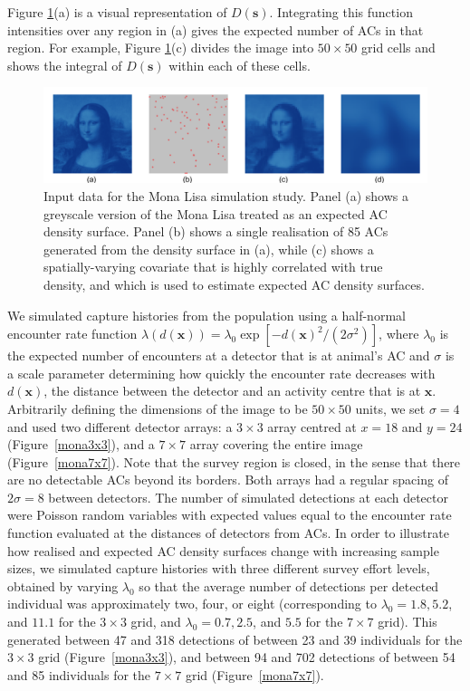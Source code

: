 \documentclass[useAMS,usenatbib,referee]{biom}
\begin{document}
Figure \ref{mlinputs}(a) is a visual representation of $D(\bm{s})$. Integrating this function intensities over any region in (a) gives the expected number of ACs in that region. For example, Figure \ref{mlinputs}(c) divides the image into 
$50 \times 50$ grid cells and shows the integral of $D(\bm{s})$ within each of these cells. 

\begin{figure}[htbp]
\centering
\includegraphics[width=1\textwidth]{mona_inputdata.png}
\caption{Input data for the Mona Lisa simulation study. Panel (a) shows a greyscale version of the Mona Lisa treated as an expected AC density surface. Panel (b) shows a single realisation of 85 ACs generated from the density surface in (a), while (c) shows a spatially-varying covariate that is highly correlated with true density, and which is used to estimate expected AC density surfaces.}
\label{mlinputs}
\end{figure}

We simulated capture histories from the population using a half-normal encounter rate function $\lambda(d(\textbf{x})) = \lambda_0\exp[-d(\textbf{x})^2/(2\sigma^2)]$, where $\lambda_0$ is the expected number of encounters at a detector that is at animal's AC and $\sigma$ is a scale parameter determining how quickly the encounter rate decreases with $d(\textbf{x})$, the distance between the detector and an activity centre that is at $\textbf{x}$. Arbitrarily defining the dimensions of the image to be $50\times 50$ units, we set $\sigma=4$ and used two different detector arrays: a $3\times3$ array centred at $x=18$ and $y=24$ (Figure~\ref{mona3x3}), and a $7\times 7$ array covering the entire image (Figure~\ref{mona7x7}). Note that the survey region is closed, in the sense that there are no detectable ACs beyond its borders. Both arrays had a regular spacing of $2\sigma=8$ between detectors. The number of simulated detections at each detector were Poisson random variables with expected values equal to the encounter rate function evaluated at the distances of detectors from ACs. In order to illustrate how realised and expected AC density surfaces change with increasing sample sizes, we simulated capture histories with three different survey effort levels, obtained by varying $\lambda_0$ so that the average number of detections per detected individual was approximately two, four, or eight (corresponding to $\lambda_0=1.8, 5.2$, and $11.1$ for the $3\times 3$ grid, and $\lambda_0=0.7, 2.5$, and $5.5$ for the $7\times 7$ grid). This generated between 47 and 318 detections of between 23 and 39 individuals for the $3\times 3$ grid (Figure~\ref{mona3x3}), and between 94 and 702 detections of between 54 and 85 individuals for the $7\times 7$ grid (Figure~\ref{mona7x7}).
\end{document}
